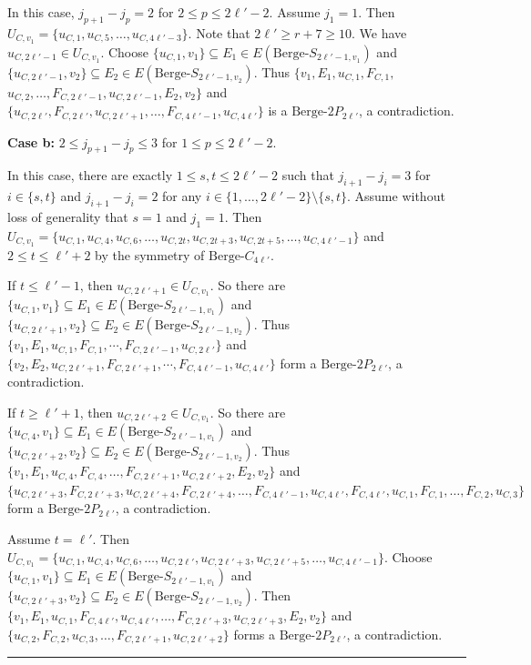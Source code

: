 \documentclass[12pt]{article}%
\def\q{\hfill\rule{1ex}{1ex}}
\def\q{\hfill\rule{1ex}{1ex}}
\newcommand{\ber}{\text{Berge-}}
\begin{document}
In this case,  $ j_{p+1}-j_{p}=2$ for $2\le p\le 2\ell'-2$. Assume $j_1=1$. Then $U_{C,v_1}=\{u_{C,1},u_{C,5},\ldots,u_{C,4\ell'-3}\}$. Note that $2\ell'\ge r+7\ge10$. We have $u_{C,2\ell'-1}\in U_{C,v_1}$.
Choose  $\{u_{C,1},v_1\}\subseteq E_{1}\in E(\ber S_{2\ell'-1,v_1})$ and $\{u_{C,2\ell'-1},v_2\}\subseteq E_{2}\in E(\ber S_{2\ell'-1,v_2})$. Thus $\{v_1,E_1,u_{C,1},F_{C,1},$ $u_{C,2}, \ldots,F_{C,2\ell'-1},u_{C,2\ell'-1},E_2,v_2\}$ and $\{u_{C,2\ell'},F_{C,2\ell'},u_{C,2\ell'+1},\ldots,F_{C,4\ell'-1},u_{C,4\ell'}\}$ is a $\ber 2P_{2\ell'}$, a contradiction.
\par\noindent
\textbf{Case b: }$2\le j_{p+1}-j_{p}\le 3$ for $1\le p\le 2\ell'-2$.
\par
In this case, there are exactly $1\le s,t\le 2\ell'-2$ such that $j_{i+1}-j_{i}=3$ for $i\in\{s,t\}$ and $j_{i+1}-j_{i}=2$ for any $i\in\{1,\ldots,2\ell'-2\}\setminus\{s,t\}$.
Assume without loss of generality that $s=1$ and $j_1=1$. Then
 $U_{C,v_1}=\{u_{C,1},u_{C,4},u_{C,6},\ldots,u_{C,2t},u_{C,2t+3},u_{C,2t+5},\ldots,u_{C,4\ell'-1}\}$ and $2\leq t\leq \ell'+2$ by the symmetry of $\ber C_{4\ell'}$.
\par
If $t\leq \ell'-1$, then $u_{C,2\ell'+1}\in U_{C,v_1}$. So
there are $\{u_{C,1},v_1\}\subseteq E_1\in E(\ber S_{2\ell'-1,v_1})$ and $\{u_{C,2\ell'+1},v_2\}\subseteq E_2\in E(\ber S_{2\ell'-1,v_2})$. Thus $\{v_1,E_1,u_{C,1},F_{C,1},\cdots,F_{C,2\ell'-1},u_{C,2\ell'}\}$ and
$\{v_2,E_2,u_{C,2\ell'+1},F_{C,2\ell'+1},\cdots,F_{C,4\ell'-1},u_{C,4\ell'}\}$ form a $\ber 2P_{2\ell'}$, a contradiction.
\par
If $t\geq \ell'+1$, then $u_{C,2\ell'+2}\in U_{C,v_1}$. So
there are
 $\{u_{C,4},v_1\}\subseteq E_1\in E(\ber S_{2\ell'-1,v_1})$ and
$\{u_{C,2\ell'+2},v_2\}\subseteq E_2\in E(\ber S_{2\ell'-1,v_2})$. Thus $\{v_1,E_1,u_{C,4},F_{C,4},\ldots,F_{C,2\ell'+1},u_{C,2\ell'+2},E_2,v_2\}$ and
$\{u_{C,2\ell'+3},F_{C,2\ell'+3},u_{C,2\ell'+4},F_{C,2\ell'+4},\ldots,F_{C,4\ell'-1},u_{C,4\ell'},F_{C,4\ell'},u_{C,1},F_{C,1},\ldots,F_{C,2},u_{C,3}\}$
form a $\ber 2P_{2\ell'}$, a contradiction.
\par
Assume $t=\ell'$. Then $U_{C,v_1}=\{u_{C,1},u_{C,4},u_{C,6},\ldots,u_{C,2\ell'},u_{C,2\ell'+3},u_{C,2\ell'+5},\ldots,u_{C,4\ell'-1}\}.$ Choose  $\{u_{C,1},v_1\}\subseteq E_{1}\in E(\ber S_{2\ell'-1,v_1})$ and $\{u_{C,2\ell'+3},v_2\}\subseteq E_{2}\in E(\ber S_{2\ell'-1,v_2})$. Then $\{v_1,E_1,u_{C,1},F_{C,4\ell'},u_{C,4\ell'}, \ldots,F_{C,2\ell'+3},u_{C,2\ell'+3},E_2,v_2\}$ and $\{u_{C,2},F_{C,2},u_{C,3},\ldots,F_{C,2\ell'+1}, u_{C,2\ell'+2}\}$ forms a $\ber 2P_{2\ell'}$, a contradiction.\q
\end{document}
